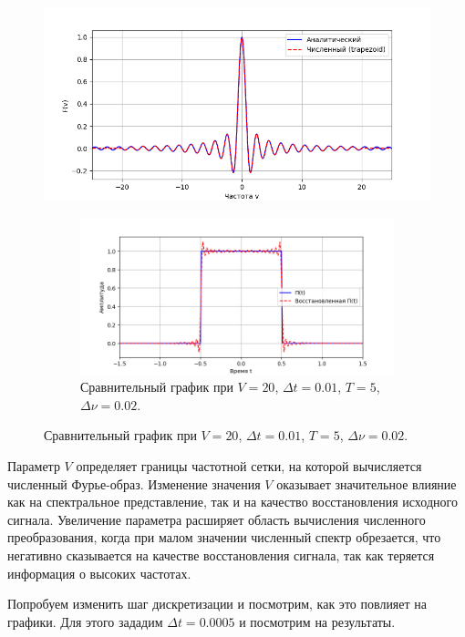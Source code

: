\documentclass[a4paper]{article}
\begin{document}
\begin{figure}[H]
  \centering
  \includegraphics[width=\textwidth]{src/task_1_1/freq_5_0.01_20_0.02.png}
  \caption{Сравнительный график образов при $V=20$, $\Delta t=0.01$, $T=5$, $\Delta \nu=0.02$, $t=0.004878 s$.} 
\begin{figure}[H]
  \centering
  \includegraphics[width=\textwidth]{src/task_1_1/time_5_0.01_20_0.02.png}
  \caption{Сравнительный график при $V=20$, $\Delta t=0.01$, $T=5$, $\Delta \nu=0.02$.} 
\end{figure}
\end{figure}
\noindent Параметр $V$ определяет границы частотной сетки, на которой вычисляется численный Фурье-образ. Изменение значения $V$ оказывает значительное влияние как на спектральное представление, так и на качество восстановления исходного сигнала. Увеличение параметра расширяет область вычисления численного преобразования, когда при малом значении численный спектр обрезается, что негативно сказывается на качестве восстановления сигнала, так как теряется информация о высоких частотах.

Попробуем изменить шаг дискретизации и посмотрим, как это повлияет на графики. Для этого зададим $\Delta t=0.0005$ и посмотрим на результаты.
\end{document}
